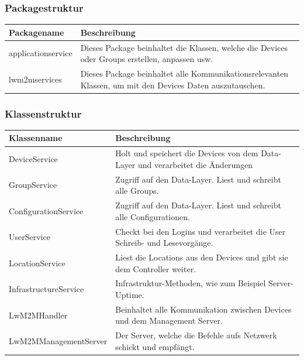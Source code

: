 \subsubsection{Packagestruktur}

\begin{table}[H]
\centering
    \begin{tabular}{@{}l p{11.9cm} @{}}\toprule    
    {Packagename} & {Beschreibung}\\ \midrule
    applicationservice & Dieses Package beinhaltet die Klassen, welche die Devices oder Groups erstellen, anpassen usw. \\       
    lwm2mservices & Dieses Package beinhaltet alle Kommunikationsrelevanten Klassen, um mit den Devices Daten auszutauschen. \\
    \bottomrule
    \end{tabular}
\end{table}

\subsubsection{Klassenstruktur}
\begin{table}[H]
\centering
    \begin{tabular}{@{}l p{11.9cm} @{}}\toprule    
    {Klassenname} & {Beschreibung}\\ \midrule
     DeviceService & Holt und speichert die Devices von dem Data-Layer und verarbeitet die Änderungen  \\       
     GroupService & Zugriff auf den Data-Layer. Liest und schreibt alle Groups.  \\       
     ConfigurationService & Zugriff auf den Data-Layer. Liest und schreibt alle Configurationen.  \\  
     UserService & Checkt bei den Logins und verarbeitet die User Schreib- und Lesevorgänge.  \\            
     LocationService & Liest die Locations aus den Devices und gibt sie dem Controller weiter.  \\       
     InfrastructureService & Infrastruktur-Methoden, wie zum Beispiel Server-Uptime.  \\       
     LwM2MHandler & Beinhaltet alle Kommunikation zwischen Devices und dem Management Server.  \\       
     LwM2MManagementServer & Der Server, welche die Befehle aufs Netzwerk schickt und empfängt.  \\       
    \bottomrule
    \end{tabular}
\end{table}
